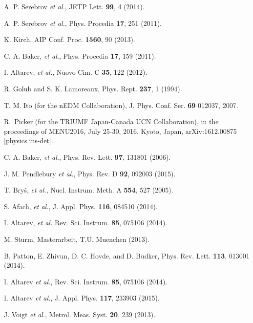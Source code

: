 \documentclass[review]{elsarticle}
\begin{document}

\begin{thebibliography}{00}

 A. P. Serebrov {\it et al.}, JETP Lett. {\bf 99}, 4
  (2014).

 A. P. Serebrov {\it et al.}, Phys. Procedia {\bf
  17}, 251 (2011).

 K. Kirch, AIP Conf. Proc. {\bf 1560}, 90 (2013).

 C. A. Baker, {\it et al.}, Phys. Procedia {\bf
  17}, 159 (2011).

 I. Altarev, {\it et al.}, Nuovo Cim. C {\bf
  35}, 122 (2012).

 R. Golub and S. K. Lamoreaux, Phys. Rept.  {\bf
  237}, 1 (1994).

 T. M. Ito (for the nEDM Collaboration),
  J. Phys. Conf. Ser. {\bf 69} 012037, 2007.

 R.~Picker (for the TRIUMF Japan-Canada UCN
  Collaboration), in the proceedings of MENU2016, July 25-30, 2016,
  Kyoto, Japan, arXiv:1612.00875 [physics.ins-det].

 C. A. Baker, {\it et al.}, Phys. Rev. Lett. {\bf
  97}, 131801 (2006).

 J. M. Pendlebury {\it et al.}, Phys. Rev. D
  {\bf 92}, 092003 (2015).

 T. Bry\'s, {\it et al.}, Nucl. Instrum. Meth. A
  {\bf 554}, 527 (2005).

 S. Afach, {\it et al.}, J. Appl. Phys. {\bf 116},
  084510 (2014).

 I. Altarev, {\it et al.}
  Rev. Sci. Instrum. {\bf 85}, 075106 (2014).

 M. Sturm, Masterarbeit, T.U. Muenchen (2013).

 B. Patton, E. Zhivun, D. C. Hovde, and D. Budker,
  Phys. Rev. Lett. {\bf 113}, 013001 (2014).


 I. Altarev {\it et al.},
  Rev. Sci. Instrum. {\bf 85}, 075106 (2014).


 I. Altarev {\it et al.}, J. Appl. Phys. {\bf 117}, 233903 (2015).



 J. Voigt {\it et al.}, Metrol. Meas. Syst. {\bf 20}, 239 (2013).


\end{thebibliography}
\end{document}
